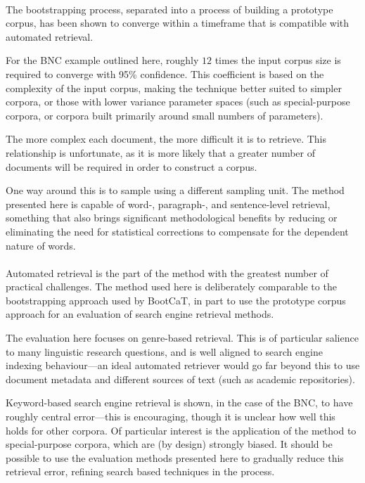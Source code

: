 \paragraph{}

The bootstrapping process, separated into a process of building a prototype corpus, has been shown to converge within a timeframe that is compatible with automated retrieval.

For the BNC example outlined here, roughly $12$ times the input corpus size is required to converge with 95\% confidence.  This coefficient is based on the complexity of the input corpus, making the technique better suited to simpler corpora, or those with lower variance parameter spaces (such as special-purpose corpora, or corpora built primarily around small numbers of parameters).

The more complex each document, the more difficult it is to retrieve.  This relationship is unfortunate, as it is more likely that a greater number of documents will be required in order to construct a corpus.

One way around this is to sample using a different sampling unit.  The method presented here is capable of word-, paragraph-, and sentence-level retrieval, something that also brings significant methodological benefits by reducing or eliminating the need for statistical corrections to compensate for the dependent nature of words.



\paragraph{}

Automated retrieval is the part of the method with the greatest number of practical challenges. The method used here is deliberately comparable to the bootstrapping approach used by BootCaT\cite{baroni2004bootcat}, in part to use the prototype corpus approach for an evaluation of search engine retrieval methods.

The evaluation here focuses on genre-based retrieval.  This is of particular salience to many linguistic research questions, and is well aligned to search engine indexing behaviour---an ideal automated retriever would go far beyond this to use document metadata and different sources of text (such as academic repositories).

Keyword-based search engine retrieval is shown, in the case of the BNC, to have roughly central error---this is encouraging, though it is unclear how well this holds for other corpora.  Of particular interest is the application of the method to special-purpose corpora, which are (by design) strongly biased.  It should be possible to use the evaluation methods presented here to gradually reduce this retrieval error, refining search based techniques in the process.

